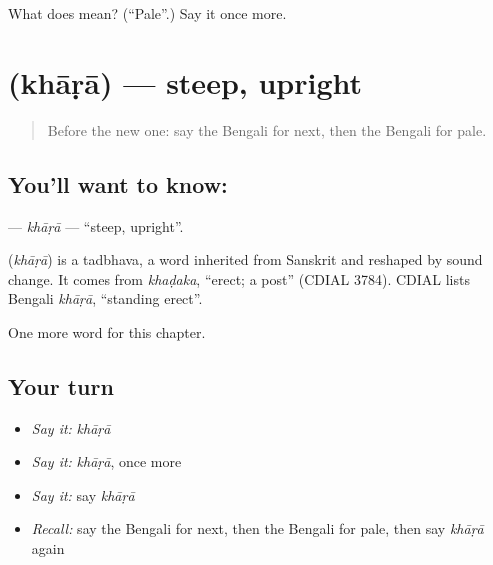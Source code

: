 \begin{tcolorbox}[breakable,colback=teal!4,colframe=teal!35!black,title={Before you move on}]
What does  mean? (\textquotedblleft{}Pale\textquotedblright{}.) Say it once more.
\end{tcolorbox}
\section[\texorpdfstring{\bn{খাড়া} (khāṛā)}{খাড়া (khāṛā)}]{ (khāṛā) — steep, upright}

\label{lesson:BN-C247-khara}



\begin{quote}
Before the new one: say the Bengali for next, then the Bengali for pale.
\end{quote}

\subsection*{You'll want to know: }
\textbf{} — \emph{khāṛā} — \textquotedblleft{}steep, upright\textquotedblright{}.

\begin{cousinweb}
\textbf{} (\emph{khāṛā}) is a tadbhava, a word inherited from Sanskrit and reshaped by sound change. It comes from \emph{khaḍaka}, \textquotedblleft{}erect; a post\textquotedblright{} (CDIAL 3784). CDIAL lists Bengali \emph{khāṛā}, \textquotedblleft{}standing erect\textquotedblright{}.
\end{cousinweb}

\begin{grammarlens}[title={What you've built}]
One more word for this chapter.
\end{grammarlens}

\subsection*{Your turn}
\begin{itemize}
\raggedright
  \item \emph{Say it:} \emph{khāṛā}
  \item \emph{Say it:} \emph{khāṛā}, once more
  \item \emph{Say it:} say \emph{khāṛā}
  \item \emph{Recall:} say the Bengali for next, then the Bengali for pale, then say \emph{khāṛā} again
\end{itemize}


